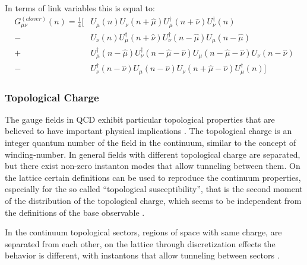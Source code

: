 In terms of link variables this is equal to:
\begin{align}
    G_{\mu\nu}^{(clover)}(n)=\frac{1}{4}\bigg[  &U_\mu(n)U_\nu(n+\hat\mu)U^\dagger_\mu(n+\hat\nu)U^\dagger_\nu(n)\\\nonumber
    - &U_\nu(n)U^\dagger_\mu(n+\hat\nu)U^\dagger_\nu(n-\hat\mu)U_\mu(n-\hat\mu)\\\nonumber
    + &U^\dagger_\mu(n-\hat\mu)U^\dagger_\nu(n-\hat\mu-\hat\nu)U_\mu(n-\hat\mu-\hat\nu)U_\nu(n-\hat\nu)\\\nonumber
    - &U^\dagger_\nu(n-\hat\nu)U_\mu(n-\hat\nu)U_\nu(n+\hat\mu-\hat\nu)U^\dagger_\mu(n) \bigg]
\end{align}


\subsubsection{Topological Charge}
The gauge fields in QCD exhibit particular topological properties that are believed to have important physical implications \cite{witten_current_1979}\cite{di_giacomo_topology_1997}. The topological charge is an integer quantum number of the field in the continuum, similar to the concept of winding-number. In general fields with different topological charge are separated, but there exist non-zero instanton modes \CIT that allow tunneling between them.
On the lattice certain definitions can be used to reproduce the continuum properties, especially for the so called ``topological susceptibility'', that is the second moment of the distribution of the topological charge, which seems to be independent from the definitions of the base observable \cite{alexandrou_comparison_2017}. 

In the continuum topological sectors, regions of space with same charge, are separated from each other, on the lattice through discretization effects the behavior is different, with instantons that allow tunneling between sectors \cite{gross_qcd_1981}.\\ 


